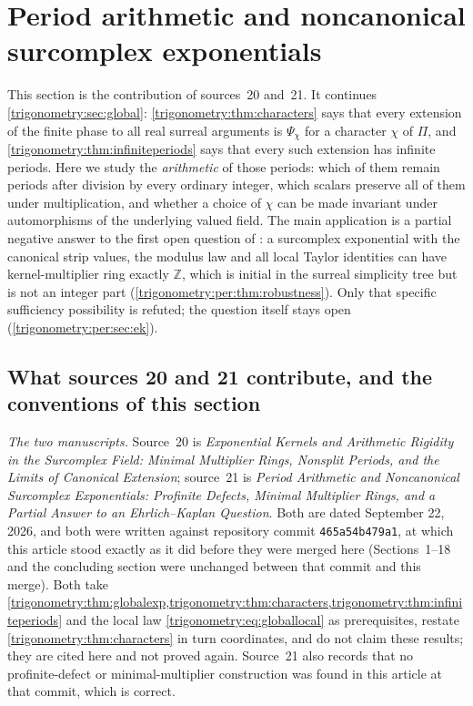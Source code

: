\documentclass[11pt,letterpaper]{article}
\numberwithin{equation}{section}
\theoremstyle{definition}
\theoremstyle{remark}
\newcommand{\Z}{\mathbb Z}
\begin{document}
\section{Period arithmetic and noncanonical surcomplex exponentials}\label{trigonometry:per:sec:main}

This section is the contribution of sources~20 and~21. It continues
\cref{trigonometry:sec:global}: \cref{trigonometry:thm:characters} says that every extension of the
finite phase to all real surreal arguments is $\Psi_\chi$ for a character $\chi$ of $\Pi$, and
\cref{trigonometry:thm:infiniteperiods} says that every such extension has infinite periods. Here we
study the \emph{arithmetic} of those periods: which of them remain periods after division by every
ordinary integer, which scalars preserve all of them under multiplication, and whether a choice of
$\chi$ can be made invariant under automorphisms of the underlying valued field. The main
application is a partial negative answer to the first open question of \cite[\S11.1]{EK}: a
surcomplex exponential with the canonical strip values, the modulus law and all local Taylor
identities can have kernel-multiplier ring exactly $\Z$, which is initial in the surreal
simplicity tree but is not an integer part (\cref{trigonometry:per:thm:robustness}). Only that
specific sufficiency possibility is refuted; the question itself stays open
(\cref{trigonometry:per:sec:ek}).

\subsection{What sources 20 and 21 contribute, and the conventions of this section}
\label{trigonometry:per:sec:overlap}
\emph{The two manuscripts.} Source~20 is \emph{Exponential Kernels and Arithmetic Rigidity in the
Surcomplex Field: Minimal Multiplier Rings, Nonsplit Periods, and the Limits of Canonical
Extension}; source~21 is \emph{Period Arithmetic and Noncanonical Surcomplex Exponentials: Profinite
Defects, Minimal Multiplier Rings, and a Partial Answer to an Ehrlich--Kaplan Question}. Both are
dated September 22, 2026, and both were written against repository commit
\texttt{465a54b479a1}, at which this article stood exactly as it did before they were merged here
(Sections~1--18 and the concluding section were unchanged between that commit and this merge).
Both take \cref{trigonometry:thm:globalexp,trigonometry:thm:characters,trigonometry:thm:infiniteperiods}
and the local law \eqref{trigonometry:eq:globallocal} as prerequisites, restate
\cref{trigonometry:thm:characters} in turn coordinates, and do not claim these results; they are
cited here and not proved again. Source~21 also records that no profinite-defect or
minimal-multiplier construction was found in this article at that commit, which is correct.
\end{document}
